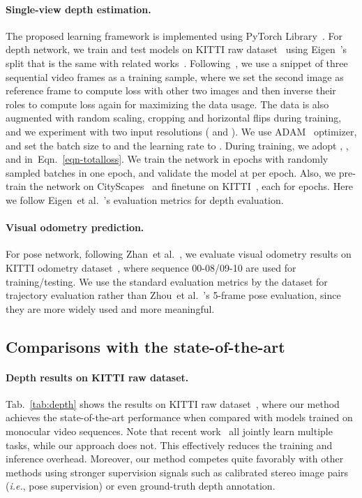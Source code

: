 \documentclass{article}
\newcommand{\tabref}[1]{Tab.~\ref{#1}}
\newcommand{\equref}[1]{Eqn.~\ref{#1}}
\def\ie{\emph{i.e.}}
\def\etal{et al.}
\begin{document}
\paragraph{Single-view depth estimation.}
The proposed learning framework is implemented using PyTorch Library~\cite{paszke2017automatic}.
For depth network, we train and test models on KITTI raw dataset~\cite{Geiger2013IJRR} using Eigen~\cite{eigen2014depth}’s split that is the same with related works~\cite{zou2018df,yin2018geonet,ranjan2019cc,zhou2017unsupervised}.
Following~\cite{zhou2017unsupervised}, we use a snippet of three sequential video frames as a training sample, 
where we set the second image as reference frame to compute loss with other two images and then inverse their roles to compute loss again for maximizing the data usage.
The data is also augmented with random scaling, cropping and horizontal flips during training, and we experiment with two input resolutions ( and ).
We use ADAM~\cite{kingma2014adam} optimizer, and set the batch size to  and the learning rate to .
During training, we adopt , , and  in~\equref{eqn-totalloss}.
We train the network in  epochs with  randomly sampled batches in one epoch, and validate the model at per epoch.
Also, we pre-train the network on CityScapes~\cite{Cordts2016Cityscapes} and finetune on KITTI~\cite{Geiger2013IJRR}, each for  epochs.
Here we follow Eigen~\etal~\cite{eigen2014depth}'s evaluation metrics for depth evaluation. 


\paragraph{Visual odometry prediction.}
For pose network, following Zhan~\etal~\cite{zhan2018unsupervised}, we evaluate visual odometry results on KITTI odometry dataset~\cite{Geiger2013IJRR}, where sequence 00-08/09-10 are used for training/testing.
We use the standard evaluation metrics by the dataset for trajectory evaluation rather than Zhou~\etal~\cite{zhou2017unsupervised}'s 5-frame pose evaluation, since they are more widely used and more meaningful.






\subsection{Comparisons with the state-of-the-art}

\paragraph{Depth results on KITTI raw dataset.}
\tabref{tab:depth} shows the results on KITTI raw dataset~\cite{Geiger2013IJRR},
where our method achieves the state-of-the-art performance when compared with models trained on monocular video sequences.
Note that recent work~\cite{yin2018geonet,zou2018df,ranjan2019cc,yang2018unsupervised} all jointly learn multiple tasks, while our approach does not.
This effectively reduces the training and inference overhead.
Moreover, our method competes quite favorably with other methods using stronger supervision signals such as calibrated stereo image pairs (\ie, pose supervision) or even ground-truth depth annotation.
\end{document}
